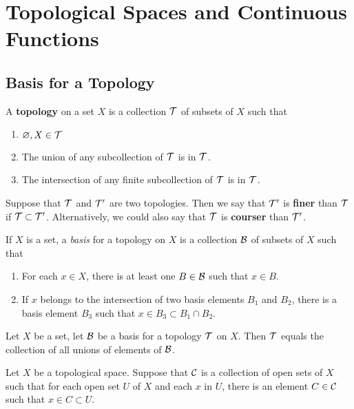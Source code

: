 \setcounter{section}{1}
\section{Topological Spaces and Continuous Functions}

\subsection{Basis for a Topology}\nl

\dfn A \textbf{topology} on a set $X$ is a collection $\mathcal{T}$ of subsets of $X$ such that 
\begin{enumerate}
    \item $\varnothing, X\in \mathcal{T}$
    \item The union of any subcollection of $\mathcal{T}$ is in $\mathcal{T}$.
    \item The intersection of any finite subcollection of $\mathcal{T}$ is in $\mathcal{T}$.
\end{enumerate}

\vs

\dfn Suppose that $\mathcal{T}$ and $\mathcal{T}^\prime$ are two topologies. Then we say that $\mathcal{T}^\prime$ is \textbf{finer} than $\mathcal{T}$ if $\mathcal{T} \subset \mathcal{T}^\prime$. Alternatively, we could also say that $\mathcal{T}$ is \textbf{courser} than $\mathcal{T}^\prime$.

\vs

\dfn If $X$ is a set, a \textit{basis} for a topology on $X$ is a collection $\mathcal{B}$ of subsets of $X$ such that 
\begin{enumerate}
    \item For each $x\in X$, there is at least one $B\in \mathcal{B}$ such that $x\in B$.
    \item If $x$ belongs to the intersection of two basis elements $B_1$ and $B_2$, there is a basis element $B_3$ such that $x\in B_3\subset B_1\cap B_2$.
\end{enumerate}

\vs

 Let $X$ be a set, let $\mathcal{B}$ be a basis for a topology $\mathcal{T}$ on $X$. Then $\mathcal{T}$ equals the collection of all unions of elements of $\mathcal{B}$.

\vs 

 Let $X$ be a topological space. Suppose that $\mathcal{C}$ is a collection of open sets of $X$ such that for each open set $U$ of $X$ and each $x$ in $U$, there is an element $C\in \mathcal{C}$ such that $x\in C\subset U$.

